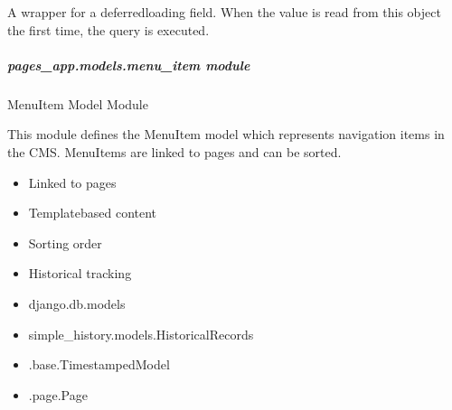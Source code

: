 \documentclass[letterpaper,10pt,english]{sphinxmanual}
\begin{document}
\begin{fulllineitems}

\begin{fulllineitems}
\label{\detokenize{pages_app.models:pages_app.models.block.Block.updated_at}}
\pysigstartsignatures
\pysigline
{}
\pysigstopsignatures
\sphinxAtStartPar
A wrapper for a deferred\sphinxhyphen{}loading field. When the value is read from this
object the first time, the query is executed.

\end{fulllineitems}


\end{fulllineitems}



\subparagraph{pages\_app.models.menu\_item module}
\label{\detokenize{pages_app.models:module-pages_app.models.menu_item}}\label{\detokenize{pages_app.models:pages-app-models-menu-item-module}}
\sphinxAtStartPar
MenuItem Model Module

\sphinxAtStartPar
This module defines the MenuItem model which represents navigation items in the CMS.
MenuItems are linked to pages and can be sorted.
\begin{description}
\begin{itemize}
\item {} 
\sphinxAtStartPar
Linked to pages

\item {} 
\sphinxAtStartPar
Template\sphinxhyphen{}based content

\item {} 
\sphinxAtStartPar
Sorting order

\item {} 
\sphinxAtStartPar
Historical tracking

\end{itemize}

\begin{itemize}
\item {} 
\sphinxAtStartPar
django.db.models

\item {} 
\sphinxAtStartPar
simple\_history.models.HistoricalRecords

\item {} 
\sphinxAtStartPar
.base.TimestampedModel

\item {} 
\sphinxAtStartPar
.page.Page

\end{itemize}

\end{description}
\end{document}
